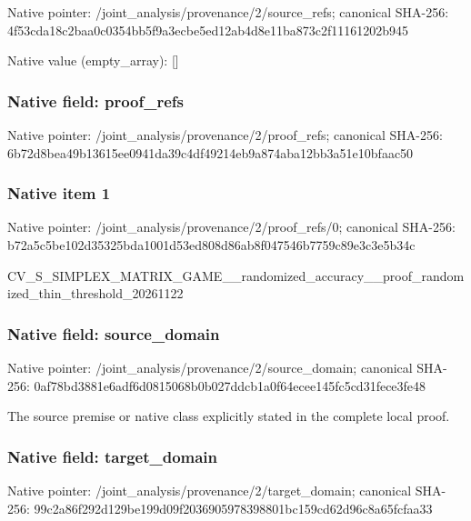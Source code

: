 \documentclass[10pt,a4paper]{article}
\begin{document}
Native pointer: /joint\_analysis/provenan\allowbreak{}ce/2/source\_refs; canonical SHA-256: 4f53cda18c2baa0c0354bb5f\allowbreak{}9a3ecbe5ed12ab4d8e11ba87\allowbreak{}3c2f11161202b945



Native value (empty\_array): []



\subsubsection{Native field: proof\_refs}


Native pointer: /joint\_analysis/provenance/2/proof\_refs; canonical SHA-256: 6b72d8bea49b13615ee0941d\allowbreak{}a39c4df49214eb9a874aba12\allowbreak{}bb3a51e10bfaac50



\subsubsection{Native item 1}


Native pointer: /joint\_analysis/provenan\allowbreak{}ce/2/proof\_refs/0; canonical SHA-256: b72a5c5be102d35325bda100\allowbreak{}1d53ed808d86ab8f047546b7\allowbreak{}759c89e3c3e5b34c


CV\_S\_SIMPLEX\_MATRIX\_GAME\allowbreak{}\_\_randomized\_accuracy\_\_p\allowbreak{}roof\_randomized\_thin\_thr\allowbreak{}eshold\_20261122


\subsubsection{Native field: source\_domain}


Native pointer: /joint\_analysis/provenan\allowbreak{}ce/2/source\_domain; canonical SHA-256: 0af78bd3881e6adf6d081506\allowbreak{}8b0b027ddcb1a0f64ecee145\allowbreak{}fc5cd31fece3fe48


The source premise or native class explicitly stated in the complete local proof.


\subsubsection{Native field: target\_domain}


Native pointer: /joint\_analysis/provenan\allowbreak{}ce/2/target\_domain; canonical SHA-256: 99c2a86f292d129be199d09f\allowbreak{}2036905978398801bc159cd6\allowbreak{}2d96c8a65fcfaa33
\end{document}
